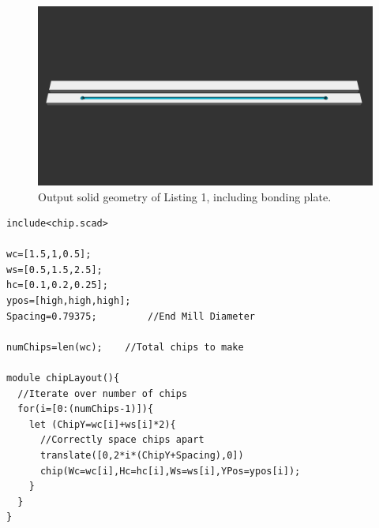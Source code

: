 \begin{figure}[htb]
  \begin{minipage}[t]{0.99\linewidth}\centering
    \includegraphics[width=14cm]{PaperExampleListing1}
  \end{minipage}\hfill
  \caption[Single solid geometry]{Output solid geometry of Listing 1, including bonding plate.}
  \label{fig:listing1}
\end{figure}

\begin{minipage}{0.99\linewidth}
\begin{lstlisting}[caption={The single line of code in Listing \ref{lst:chip} can then be iterated upon to form an array of different device geometries that can be sent directly to a CAM tool for toolpath generation}, label={lst:chipLayout}, frame=single, language=scad]
include<chip.scad>

wc=[1.5,1,0.5];		 
ws=[0.5,1.5,2.5];
hc=[0.1,0.2,0.25];
ypos=[high,high,high];
Spacing=0.79375;         //End Mill Diameter

numChips=len(wc);	 //Total chips to make

module chipLayout(){
  //Iterate over number of chips
  for(i=[0:(numChips-1)]){
    let (ChipY=wc[i]+ws[i]*2){
      //Correctly space chips apart
      translate([0,2*i*(ChipY+Spacing),0])
      chip(Wc=wc[i],Hc=hc[i],Ws=ws[i],YPos=ypos[i]);
    }
  }
}
\end{lstlisting}
\end{minipage}


